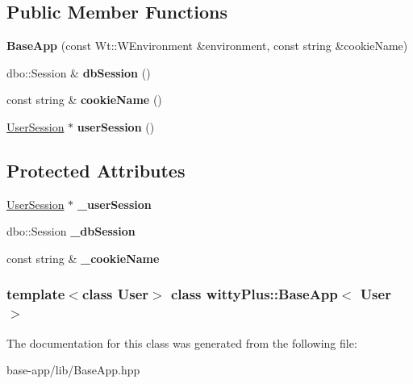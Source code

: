 \subsection*{Public Member Functions}
\begin{DoxyCompactItemize}
\item 
\hypertarget{classwittyPlus_1_1BaseApp_af7f69320e0cf8c59302af2a98d144c20}{
{\bfseries BaseApp} (const Wt::WEnvironment \&environment, const string \&cookieName)}
\label{classwittyPlus_1_1BaseApp_af7f69320e0cf8c59302af2a98d144c20}

\item 
\hypertarget{classwittyPlus_1_1BaseApp_a7f5e0c4a805013cc5de3fd52123da513}{
dbo::Session \& {\bfseries dbSession} ()}
\label{classwittyPlus_1_1BaseApp_a7f5e0c4a805013cc5de3fd52123da513}

\item 
\hypertarget{classwittyPlus_1_1BaseApp_a32d1c2fbca91c996f09cfe31316abc33}{
const string \& {\bfseries cookieName} ()}
\label{classwittyPlus_1_1BaseApp_a32d1c2fbca91c996f09cfe31316abc33}

\item 
\hypertarget{classwittyPlus_1_1BaseApp_a0cd86d0b8bc591d3b45c7a26fd6a6833}{
\hyperlink{classwittyPlus_1_1SessionHandle}{UserSession} $\ast$ {\bfseries userSession} ()}
\label{classwittyPlus_1_1BaseApp_a0cd86d0b8bc591d3b45c7a26fd6a6833}

\end{DoxyCompactItemize}
\subsection*{Protected Attributes}
\begin{DoxyCompactItemize}
\item 
\hypertarget{classwittyPlus_1_1BaseApp_a4b29240772b07ae66df08954d0ac43a4}{
\hyperlink{classwittyPlus_1_1SessionHandle}{UserSession} $\ast$ {\bfseries \_\-userSession}}
\label{classwittyPlus_1_1BaseApp_a4b29240772b07ae66df08954d0ac43a4}

\item 
\hypertarget{classwittyPlus_1_1BaseApp_aa48f07a8f0527bf36dcde9690c09acd5}{
dbo::Session {\bfseries \_\-dbSession}}
\label{classwittyPlus_1_1BaseApp_aa48f07a8f0527bf36dcde9690c09acd5}

\item 
\hypertarget{classwittyPlus_1_1BaseApp_a4f4bba5c993527829c2b431b72638169}{
const string \& {\bfseries \_\-cookieName}}
\label{classwittyPlus_1_1BaseApp_a4f4bba5c993527829c2b431b72638169}

\end{DoxyCompactItemize}
\subsubsection*{template$<$class User$>$ class wittyPlus::BaseApp$<$ User $>$}



The documentation for this class was generated from the following file:\begin{DoxyCompactItemize}
\item 
base-\/app/lib/BaseApp.hpp\end{DoxyCompactItemize}
